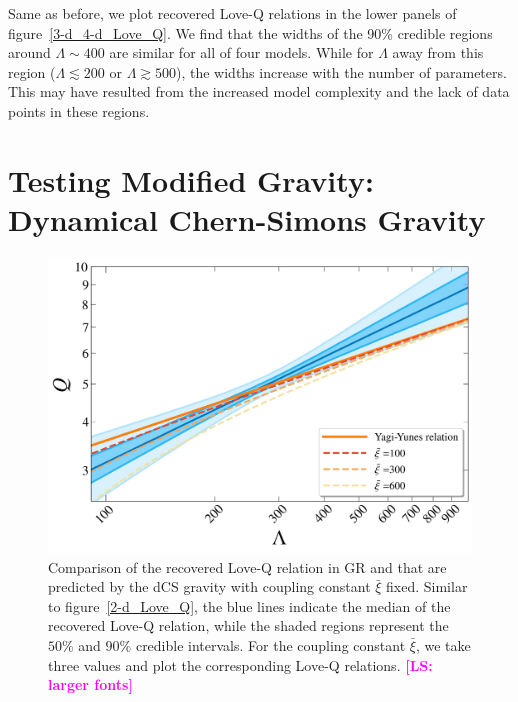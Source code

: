 \documentclass[a4paper,11pt]{article}
\newcommand{\LS}[1]{\textcolor{magenta}{\bf #1}}
\begin{document}
Same as before, we plot recovered Love-Q relations in the lower panels of 
figure~\ref{3-d_4-d_Love_Q}. We find that the widths of the 90\% credible
regions around $\Lambda \sim 400$ are similar for all of four models. While for
$\Lambda$ away from this region ($\Lambda \lesssim 200$ or $\Lambda \gtrsim
500$), the widths increase with the number of parameters. This may have resulted
from the increased model complexity and the lack of data points in these
regions. 

\section{Testing Modified Gravity: Dynamical Chern-Simons Gravity}
\label{sec:dCS}

\begin{figure}[t]
    \centering
    \begin{minipage}{0.6\linewidth}
        \includegraphics[width=\linewidth]{fig_CS_xi_bar_APR4_2d.pdf}
    \end{minipage}
    \caption{Comparison of the recovered Love-Q relation in GR and that are
    predicted by the dCS gravity with coupling constant $\bar{\xi}$ fixed.
    Similar to figure~\ref{2-d_Love_Q}, the blue lines indicate the median of
    the recovered Love-Q relation, while the shaded regions represent the $50\%$
    and $90\%$ credible intervals. For the coupling constant $\bar\xi$, we take
    three values and plot the corresponding Love-Q relations. \LS{[LS: larger
    fonts]}}
    \label{cs_Love_Q}
\end{figure}
\end{document}

